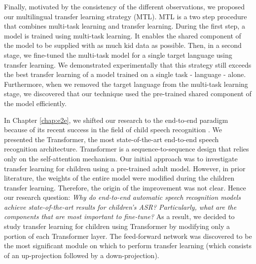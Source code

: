 Finally, motivated by the consistency of the different observations, we proposed our multilingual transfer learning strategy (MTL). MTL is a two step procedure that combines multi-task learning and transfer learning. During the first step, a model is trained using multi-task learning. It enables the shared component of the model to be supplied with as much kid data as possible. Then, in a second stage, we fine-tuned the multi-task model for a single target language using transfer learning. We demonstrated experimentally that this strategy still exceeds the best transfer learning of a model trained on a single task - language - alone. Furthermore, when we removed the target language from the multi-task learning stage, we discovered that our technique used the pre-trained shared component of the model efficiently.

In Chapter \ref{chap:e2e}, we shifted our research to the end-to-end paradigm because of its recent success in the field of child speech recognition \cite{sri_end2end,gelin2021endtoend}. We presented the Transformer, the most state-of-the-art end-to-end speech recognition architecture. Transformer is a sequence-to-sequence design that relies only on the self-attention mechanism. Our initial approach was to investigate transfer learning for children using a pre-trained adult model. However, in prior literature, the weights of the entire model were modified during the children transfer learning. Therefore, the origin of the improvement was not clear. Hence our research question: \textit{Why do end-to-end automatic speech recognition models achieve state-of-the-art results for children's ASR? Particularly, what are the components that are most important to fine-tune?} As a result, we decided to study transfer learning for children using Transformer by modifying only a portion of each Transformer layer. The feed-forward network was discovered to be the most significant module on which to perform transfer learning (which consists of an up-projection followed by a down-projection).

